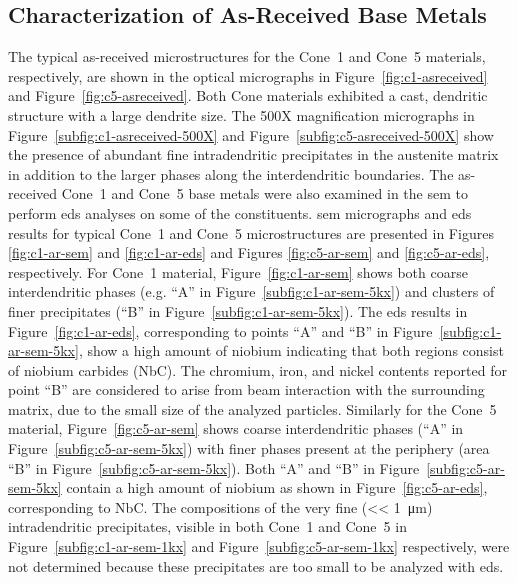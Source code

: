 \subsection{Characterization of As-Received Base Metals}
The typical as-received microstructures for the Cone~1 and Cone~5 materials, respectively, are shown in the optical micrographs in Figure~\ref{fig:c1-asreceived} and Figure~\ref{fig:c5-asreceived}.  Both Cone materials exhibited a cast, dendritic structure with a large dendrite size.  The 500X magnification micrographs in Figure~\ref{subfig:c1-asreceived-500X} and Figure~\ref{subfig:c5-asreceived-500X} show the presence of abundant fine intradendritic precipitates in the austenite matrix in addition to the larger phases along the interdendritic boundaries. The as-received Cone~1 and Cone~5 base metals were also examined in the \gls{sem} to perform \gls{eds} analyses on some of the constituents. \Gls{sem} micrographs and \gls{eds} results for typical Cone~1 and Cone~5 microstructures are presented in Figures \ref{fig:c1-ar-sem} and \ref{fig:c1-ar-eds} and Figures \ref{fig:c5-ar-sem} and \ref{fig:c5-ar-eds}, respectively. For Cone~1 material, Figure~\ref{fig:c1-ar-sem} shows both coarse interdendritic phases (e.g. ``A'' in Figure~\ref{subfig:c1-ar-sem-5kx}) and clusters of finer precipitates (``B'' in Figure~\ref{subfig:c1-ar-sem-5kx}). The \gls{eds} results in Figure~\ref{fig:c1-ar-eds}, corresponding to points ``A'' and ``B'' in Figure~\ref{subfig:c1-ar-sem-5kx}, show a high amount of niobium indicating that both regions consist of niobium carbides (NbC). The chromium, iron, and nickel contents reported for point ``B'' are considered to arise from beam interaction with the surrounding matrix, due to the small size of the analyzed particles. Similarly for the Cone~5 material, Figure~\ref{fig:c5-ar-sem} shows coarse interdendritic phases (``A'' in Figure~\ref{subfig:c5-ar-sem-5kx}) with finer phases present at the periphery (area ``B'' in Figure~\ref{subfig:c5-ar-sem-5kx}). Both ``A'' and ``B'' in Figure~\ref{subfig:c5-ar-sem-5kx} contain a high amount of niobium as shown in Figure~\ref{fig:c5-ar-eds}, corresponding to NbC. The compositions of the very fine (<< \SI{1}{\micro\meter}) intradendritic precipitates, visible in both Cone~1 and Cone~5 in Figure~\ref{subfig:c1-ar-sem-1kx} and Figure~\ref{subfig:c5-ar-sem-1kx} respectively, were not determined because these precipitates are too small to be analyzed with \gls{eds}. 

